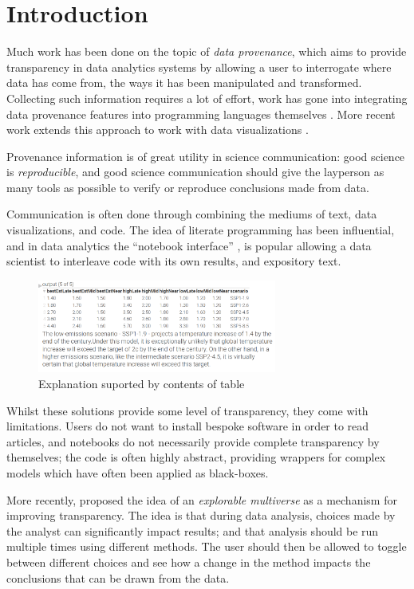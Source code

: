 \section{Introduction}

Much work has been done on the topic of \emph{data provenance}, which aims to provide
transparency in data analytics systems by allowing a user to interrogate where data has come
from, the ways it has been manipulated and transformed. Collecting such information
requires a lot of effort, work has gone into integrating data provenance features
into programming languages themselves \cite{fehrenbach16}. More recent work
extends this approach to work with data visualizations \cite{perera22}.

Provenance information is of great utility in science communication: good science is
\emph{reproducible}, and good science communication should give the layperson as many tools
as possible to verify or reproduce conclusions made from data.

Communication is often done through combining the mediums of text,
data visualizations, and code. The idea of literate programming \cite{knuth84} has
been influential, and in data analytics the ``notebook interface'' \cite{kluyver16}, is popular
allowing a data scientist to interleave code with its own results, and expository text. 

\begin{figure}[h]
   \includegraphics[width=0.7\textwidth]{fig/ipcc-table-explanation.png}
   \caption{Explanation suported by contents of table}
   \label{fig:table-explanation}
\end{figure}

Whilst these solutions provide some level of transparency, they come with limitations. Users do not want to 
install bespoke software in order to read articles, and notebooks do not necessarily provide complete
transparency by themselves; the code is often highly abstract, providing wrappers
for complex models which have often been applied as black-boxes.

More recently, \cite{dragicevic19} proposed the idea of an \emph{explorable multiverse} as a
mechanism for improving transparency. The idea is that during data analysis, choices made by
the analyst can significantly impact results; and that analysis should be run multiple times
using different methods. The user should then be allowed to toggle between different choices
and see how a change in the method impacts the conclusions that can be drawn from the data.


